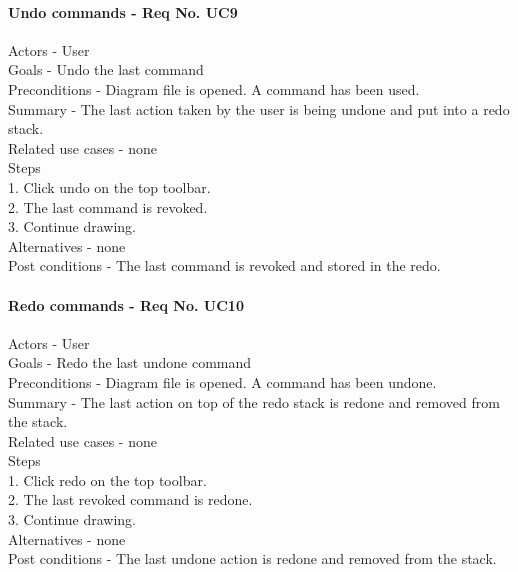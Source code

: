 \documentclass[twoside,letterpaper]{article}
\begin{document}
{\paragraph{Undo commands - Req No. UC9\newline}
Actors - User\\
Goals - Undo the last command\\
Preconditions - Diagram file is opened. A command has been used.\\
Summary - The last action taken by the user is being undone and put into a redo stack.\\
Related use cases - none\\
Steps\\
1. Click undo on the top toolbar.\\
2. The last command is revoked.\\
3. Continue drawing.\\
Alternatives - none\\
Post conditions - The last command is revoked and stored in the redo.\\

\paragraph{Redo commands - Req No. UC10\newline}
Actors - User\\
Goals - Redo the last undone command\\
Preconditions - Diagram file is opened. A command has been undone.\\
Summary - The last action on top of the redo stack is redone and removed from the stack.\\
Related use cases - none\\
Steps\\
1. Click redo on the top toolbar.\\
2. The last revoked command is redone.\\
3. Continue drawing.\\
Alternatives - none\\
Post conditions - The last undone action is redone and removed from the stack.\\

}
\end{document}
